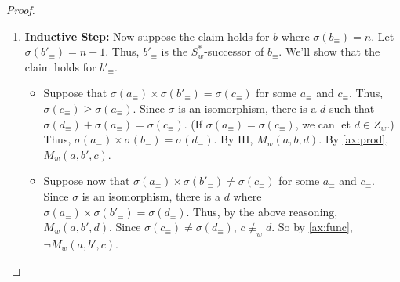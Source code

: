 \documentclass[10pt,a4paper]{amsart}
\begin{document}
\begin{proof}
\begin{enumerate}
\begin{enumerate}[label=(\roman*)]
            \item \textbf{Inductive Step:} Now suppose the claim holds for $b$ where $\sigma(b_\equiv) = n$. 
            Let $\sigma(b'_\equiv) = n+1$. 
            Thus, $b'_\equiv$ is the $S_w^*$-successor of $b_\equiv$. 
            We'll show that the claim holds for $b'_\equiv$. 
            \begin{itemize}
                \item[($\Leftarrow$)] Suppose that $\sigma(a_\equiv) \times \sigma(b'_\equiv) = \sigma(c_\equiv)$ for some $a_\equiv$ and $c_\equiv$. 
                Thus, $\sigma(c_\equiv) \geq \sigma(a_\equiv)$. 
                Since $\sigma$ is an isomorphism, there is a $d$ such that $\sigma(d_\equiv) + \sigma(a_\equiv) = \sigma(c_\equiv)$. 
                (If $\sigma(a_\equiv) = \sigma(c_\equiv)$, we can let $d \in Z_w$.) 
                Thus, $\sigma(a_\equiv) \times \sigma(b_\equiv) = \sigma(d_\equiv)$. 
                By IH, $M_w(a,b,d)$. 
                By \ref{ax:prod}, $M_w(a,b',c)$. 


                \item[($\Rightarrow$)] Suppose now that $\sigma(a_\equiv) \times \sigma(b'_\equiv) \neq \sigma(c_\equiv)$ for some $a_\equiv$ and $c_\equiv$. 
                Since $\sigma$ is an isomorphism, there is a $d$ where $\sigma(a_\equiv) \times \sigma(b'_\equiv) = \sigma(d_\equiv)$. 
                Thus, by the above reasoning, $M_w(a,b',d)$. 
                Since $\sigma(c_\equiv) \neq \sigma(d_\equiv)$, $c \not\equiv_w d$. 
                So by \ref{ax:func}, $\neg M_w(a,b',c)$. 
            \end{itemize}
        \end{enumerate}
    \end{enumerate}
\end{proof}
\end{document}
